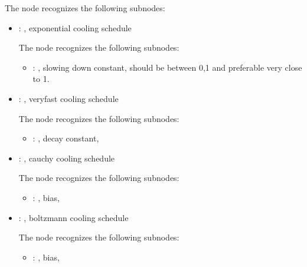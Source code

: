 \begin{itemize}
      The  node recognizes the following subnodes:
      \begin{itemize}
        \item {}: ,
          exponential cooling schedule

          The  node recognizes the following subnodes:
          \begin{itemize}
            \item {}: ,
              slowing down constant, should be between 0,1 and preferable very close to 1.
          \end{itemize}

        \item {}: ,
          veryfast cooling schedule

          The  node recognizes the following subnodes:
          \begin{itemize}
            \item {}: ,
              decay constant, 
          \end{itemize}

        \item {}: ,
          cauchy cooling schedule

          The  node recognizes the following subnodes:
          \begin{itemize}
            \item {}: ,
              bias, 
          \end{itemize}

        \item {}: ,
          boltzmann cooling schedule

          The  node recognizes the following subnodes:
          \begin{itemize}
            \item {}: ,
              bias, 
          \end{itemize}
      \end{itemize}


\end{itemize}
